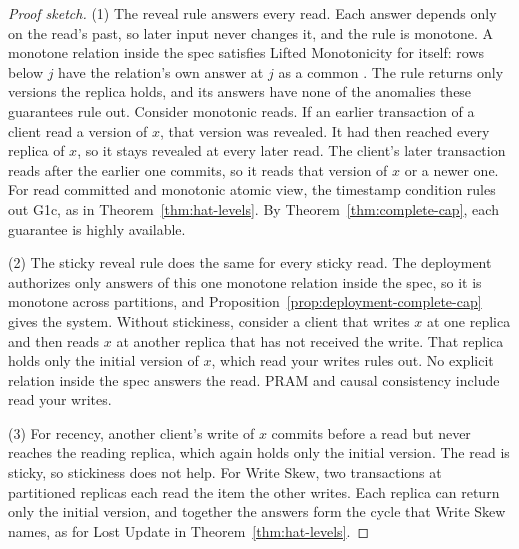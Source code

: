 \begin{proof}[Proof sketch]
(1) The reveal rule answers every read.  Each answer depends only on the read's
past, so later input never changes it, and the rule is monotone.  A monotone
relation inside the spec satisfies Lifted Monotonicity for itself: rows below
$j$ have the relation's own answer at $j$ as a common \outnoun.  The rule
returns only versions the replica holds, and its answers have none of the
anomalies these guarantees rule out.  Consider monotonic reads.  If an earlier
transaction of a client read a version of $x$, that version was revealed.  It
had then reached every replica of $x$, so it stays revealed at every later
read.  The client's later transaction reads after the earlier one commits, so
it reads that version of $x$ or a newer one.
For read committed and monotonic atomic view, the timestamp condition rules
out G1c, as in Theorem~\ref{thm:hat-levels}.  By
Theorem~\ref{thm:complete-cap}, each guarantee is highly available.

(2) The sticky reveal rule does the same for every sticky read.  The deployment
authorizes only answers of this one monotone relation inside the spec, so it
is monotone across partitions, and Proposition~\ref{prop:deployment-complete-cap}
gives the system.  Without stickiness, consider a client that writes $x$ at
one replica and then reads $x$ at another replica that has not received the
write.  That replica holds only the initial version of $x$, which read your
writes rules out.  No explicit relation inside the spec answers the read.
PRAM and causal consistency include read your writes.

(3) For recency, another client's write of $x$ commits before a read but never
reaches the reading replica, which again holds only the initial version.  The
read is sticky, so stickiness does not help.  For Write Skew, two transactions
at partitioned replicas each read the item the other writes.  Each replica can
return only the initial version, and together the answers form the cycle that
Write Skew names, as for Lost Update in Theorem~\ref{thm:hat-levels}.
\end{proof}

